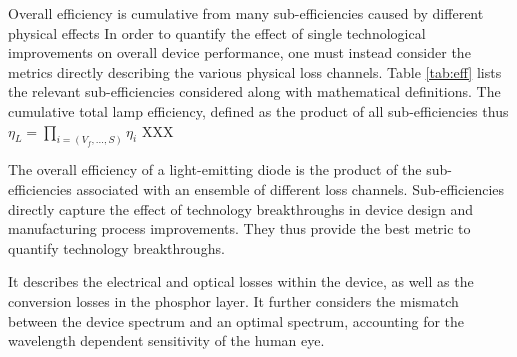\documentclass[a4paper,nocompress]{spie}  %
\begin{document}
Overall efficiency is cumulative from many sub-efficiencies caused by different physical effects \cite{schubert2018light}
In order to quantify the effect of single technological improvements on overall device performance, one must instead consider the metrics directly describing the various physical loss channels. Table \ref{tab:eff} lists the relevant sub-efficiencies considered along with mathematical definitions. The cumulative total lamp efficiency, defined as the product of all sub-efficiencies thus $\eta_L = \prod_{i=(V_f,\dots,S)} \eta_i$ XXX

The overall efficiency of a light-emitting diode is the product of the sub-efficiencies associated with an ensemble of different loss channels. Sub-efficiencies directly capture the effect of technology breakthroughs in device design and manufacturing process improvements. They thus provide the best metric to quantify technology breakthroughs.



        It describes the electrical and optical losses within the device, as well as the conversion losses in the phosphor layer. It further considers the mismatch between the device spectrum and an optimal spectrum, accounting for the wavelength dependent sensitivity of the human eye.
\end{document}

